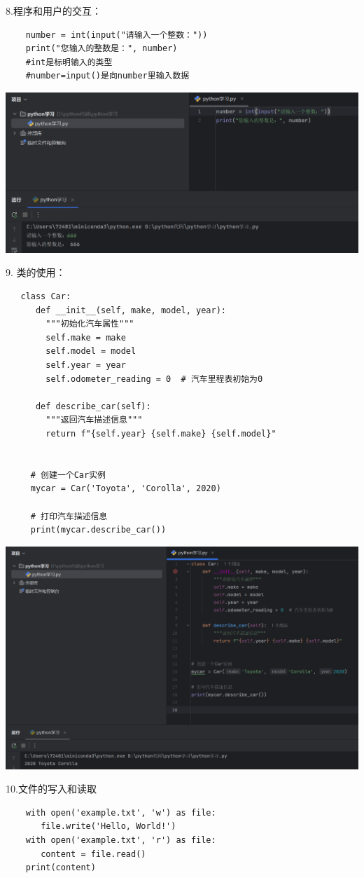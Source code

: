 \documentclass{article}
\begin{document}
8.程序和用户的交互：
\begin{verbatim}
    number = int(input("请输入一个整数："))
    print("您输入的整数是：", number)
    #int是标明输入的类型
    #number=input()是向number里输入数据
\end{verbatim}

\noindent
\begin{minipage}{\linewidth}
 \centering
  \includegraphics[width=0.5\linewidth]{python8.png}
  \label{fig:example}
\end{minipage}



9. 类的使用：
\begin{verbatim}
   class Car:
      def __init__(self, make, model, year):
        """初始化汽车属性"""
        self.make = make
        self.model = model
        self.year = year
        self.odometer_reading = 0  # 汽车里程表初始为0

      def describe_car(self):
        """返回汽车描述信息"""
        return f"{self.year} {self.make} {self.model}"


     # 创建一个Car实例
     mycar = Car('Toyota', 'Corolla', 2020)

     # 打印汽车描述信息
     print(mycar.describe_car())
\end{verbatim}

\begin{minipage}{\linewidth}
    \centering
     \includegraphics[width=0.5\linewidth]{python9.png}
     \label{fig:example}
\end{minipage}


10.文件的写入和读取
\begin{verbatim}
    with open('example.txt', 'w') as file:
       file.write('Hello, World!')
    with open('example.txt', 'r') as file:
       content = file.read()
    print(content)
\end{verbatim}
\end{document}
